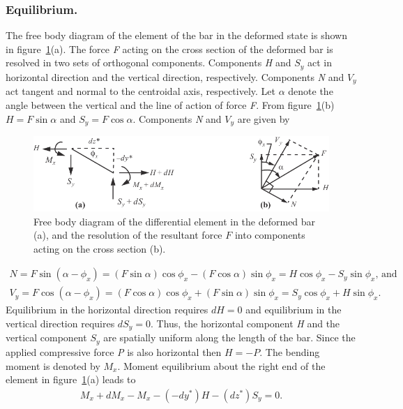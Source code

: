 \documentclass{AeroStructure-ERJohnson}
\begin{document}
\subsubsection{Equilibrium.} The free body diagram of the element of the bar in the deformed state is shown in figure~\ref{fig11.3}(a). The force \textit{F} acting on the cross section of the deformed bar is resolved in two sets of orthogonal components. Components \textit{H} and $S_{y}$ act in horizontal direction and the vertical direction, respectively. Components \textit{N} and $V_{y}$ act tangent and normal to the centroidal axis, respectively. Let $\alpha$ denote the angle between the vertical and the line of action of force \textit{F}. From figure~\ref{fig11.3}(b) $H=F\sin\alpha$ and $S_{y}=F \cos \alpha$. Components \textit{N} and $V_{y}$ are given\vspace*{-5pt} by
\begin{figure}[!h]
\centerline{\includegraphics{Figure_11-3.pdf}}
\caption{Free body diagram of the differential element in the deformed bar (a), and the resolution of the resultant force $F$ into components acting on the cross section (b).} \label{fig11.3}\vspace*{-5pt}
\end{figure}
\begin{gather}
N=F \sin \left(\alpha-\phi_{x}\right)=(F \sin \alpha) \cos \phi_{x}-(F \cos \alpha) \sin \phi_{x}=H \cos \phi_{x}-S_{y} \sin \phi_{x} ,\,\textrm{and} \label{eq11.8}\\
V_{y}=F \cos \left(\alpha-\phi_{x}\right)=(F \cos \alpha) \cos \phi_{x}+(F \sin \alpha) \sin \phi_{x}=S_{y} \cos \phi_{x}+H \sin \phi_{x}. \label{eq11.9}
\end{gather}
Equilibrium in the horizontal direction requires $dH=0$ and equilibrium in the vertical direction requires $ d S_{y}=0 $. Thus, the horizontal component \textit{H} and the vertical component $ S_{y} $ are spatially uniform along the length of the bar. Since the applied compressive force \textit{P} is also horizontal then $ H=-P $. The bending moment is denoted by $M_{x}$. Moment equilibrium about the right end of the element in figure~\ref{fig11.3}(a) leads to
\begin{align}\label{eq11.10}
 M_{x}+d M_{x}-M_{x}-\left(-d y^{*}\right) H-\left(d z^{*}\right) S_{y}=0.
\end{align}
\end{document}
